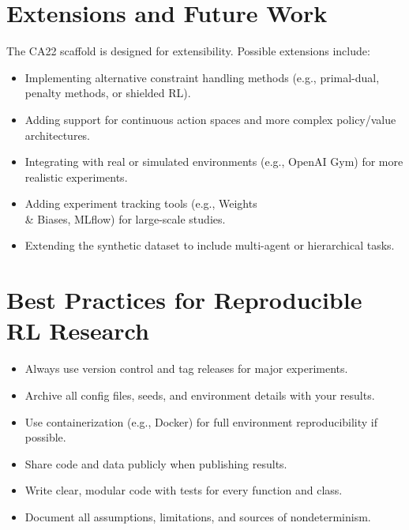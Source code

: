 \documentclass[11pt]{article}
\begin{document}
\section{Extensions and Future Work}
The CA22 scaffold is designed for extensibility. Possible extensions include:
\begin{itemize}
  \item Implementing alternative constraint handling methods (e.g., primal-dual, penalty methods, or shielded RL).
  \item Adding support for continuous action spaces and more complex policy/value architectures.
  \item Integrating with real or simulated environments (e.g., OpenAI Gym) for more realistic experiments.
  \item Adding experiment tracking tools (e.g., Weights \\& Biases, MLflow) for large-scale studies.
  \item Extending the synthetic dataset to include multi-agent or hierarchical tasks.
\end{itemize}

\section{Best Practices for Reproducible RL Research}
\begin{itemize}
  \item Always use version control and tag releases for major experiments.
  \item Archive all config files, seeds, and environment details with your results.
  \item Use containerization (e.g., Docker) for full environment reproducibility if possible.
  \item Share code and data publicly when publishing results.
  \item Write clear, modular code with tests for every function and class.
  \item Document all assumptions, limitations, and sources of nondeterminism.
\end{itemize}
\end{document}
